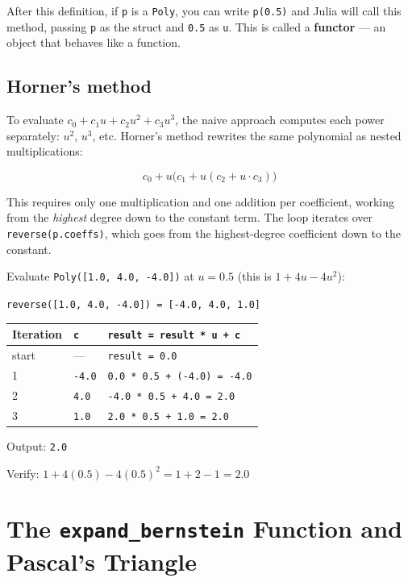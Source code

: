 \documentclass[12pt, a4paper]{article}
\newcommand{\cd}[1]{\texttt{#1}}
\begin{document}
After this definition, if \cd{p} is a \cd{Poly}, you can write
\cd{p(0.5)} and Julia will call this method, passing \cd{p} as the
struct and \cd{0.5} as \cd{u}.
This is called a \textbf{functor} --- an object that behaves like a function.

\subsection{Horner's method}

To evaluate $c_0 + c_1 u + c_2 u^2 + c_3 u^3$, the naive approach
computes each power separately: $u^2$, $u^3$, etc.
Horner's method rewrites the same polynomial as nested multiplications:

\[
  c_0 + u\bigl(c_1 + u(c_2 + u \cdot c_3)\bigr)
\]

This requires only one multiplication and one addition per coefficient,
working from the \emph{highest} degree down to the constant term.
The loop iterates over \cd{reverse(p.coeffs)}, which goes from the
highest-degree coefficient down to the constant.

\begin{examplebox}
Evaluate \cd{Poly([1.0, 4.0, -4.0])} at $u = 0.5$
(this is $1 + 4u - 4u^2$):

\medskip
\cd{reverse([1.0, 4.0, -4.0]) = [-4.0, 4.0, 1.0]}

\medskip
\begin{tabular}{lll}
\toprule
Iteration & \cd{c} & \cd{result = result * u + c} \\
\midrule
start  & ---    & \cd{result = 0.0} \\
1      & \cd{-4.0} & \cd{0.0 * 0.5 + (-4.0) = -4.0} \\
2      & \cd{4.0}  & \cd{-4.0 * 0.5 + 4.0 = 2.0} \\
3      & \cd{1.0}  & \cd{2.0 * 0.5 + 1.0 = 2.0} \\
\bottomrule
\end{tabular}

\medskip
Output: \cd{2.0}

Verify: $1 + 4(0.5) - 4(0.5)^2 = 1 + 2 - 1 = 2.0$ \checkmark
\end{examplebox}




\section{The \texttt{expand\_bernstein} Function and Pascal's Triangle}
\end{document}
